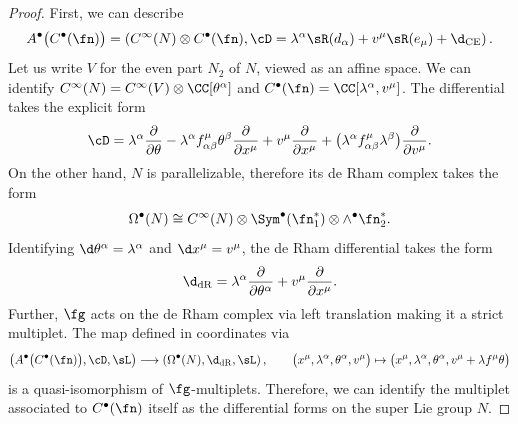 \begin{proof}
	First, we can describe
	\begin{equation*}
	A^\bullet\big(C^\bullet(\fn)\big) = \left( C^\infty(N) \otimes C^\bullet(\fn) , \cD = \lambda^\alpha \sR(d_\alpha) + v^\mu \sR(e_\mu) + \d_{\mathrm{CE}} \right) .
	\end{equation*}
	Let us write $V$ for the even part $N_2$ of $N$, viewed as an affine space. We can identify $C^\infty(N) = C^\infty(V) \otimes \CC[\theta^\alpha]$ and $C^\bullet(\fn) = \CC[\lambda^\alpha , v^\mu]$. The differential takes the explicit form
	\begin{equation*}
	\cD = \lambda^\alpha \frac{\partial}{\partial \theta} - \lambda^\alpha f^\mu_{\alpha \beta} \theta^\beta \frac{\partial}{\partial x^\mu} + v^\mu \frac{\partial}{\partial x^\mu} + \big(\lambda^\alpha f^\mu_{\alpha \beta} \lambda^\beta\big) \frac{\partial}{\partial v^\mu} .
	\end{equation*}
	On the other hand, $N$ is parallelizable, therefore its de Rham complex takes the form
	\begin{equation*}
	\Omega^\bullet(N) \cong C^\infty(N) \otimes \Sym^\bullet(\fn_1^*) \otimes \wedge^\bullet\fn_2^* .
	\end{equation*}
	Identifying $\d\theta^\alpha = \lambda^\alpha$ and $\d x^\mu = v^\mu$, the de Rham differential takes the form
	\begin{equation*}
	\d_{\mathrm{dR}} = \lambda^\alpha \frac{\partial}{\partial \theta^\alpha} + v^\mu \frac{\partial}{\partial x^\mu} .
	\end{equation*}
	Further, $\fg$ acts on the de Rham complex via left translation making it a strict multiplet. The map defined in coordinates via
	\begin{equation*}
	\big( A^\bullet\big(C^\bullet(\fn)\big) , \cD , \sL \big) \longrightarrow \left( \Omega^\bullet(N) , \d_{\mathrm{dR}} , \sL \right), \qquad \big(x^\mu, \lambda^\alpha, \theta^\alpha , v^\mu\big) \mapsto \big(x^\mu, \lambda^\alpha, \theta^\alpha, v^\mu + \lambda f^\mu \theta\big)
	\end{equation*}
	is a quasi-isomorphism of $\fg$-multiplets. Therefore, we can identify the multiplet associated to $C^\bullet(\fn)$ itself as the differential forms on the super Lie group $N$.
\end{proof}


